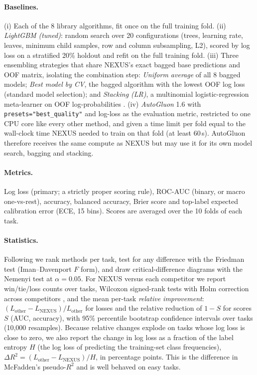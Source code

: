 \paragraph{Baselines.} (i) Each of the 8 library algorithms, fit once on the full
training fold. (ii) \emph{LightGBM (tuned)}: random search over 20
configurations (trees, learning rate, leaves, minimum child samples, row and
column subsampling, L2), scored by log loss on a stratified 20\% holdout and
refit on the full training fold. (iii) Three ensembling strategies that share
NEXUS's exact bagged base predictions and OOF matrix, isolating the combination
step: \emph{Uniform average} of all 8 bagged models; \emph{Best model by CV},
the bagged algorithm with the lowest OOF log loss (standard model selection);
and \emph{Stacking (LR)}, a multinomial logistic-regression meta-learner on
OOF log-probabilities \citep{wolpert1992stacked,breiman1996stacked}.
(iv) \emph{AutoGluon} 1.6 \citep{erickson2020autogluon} with
\texttt{presets="best\_quality"} and log-loss as the evaluation metric,
restricted to one CPU core like every other method, and given a time limit
per fold equal to the wall-clock time NEXUS needed to train on that fold (at
least 60\,s). AutoGluon therefore receives the same compute as NEXUS but may
use it for its own model search, bagging and stacking.

\paragraph{Metrics.} Log loss (primary; a strictly proper scoring rule),
ROC-AUC (binary, or macro one-vs-rest), accuracy, balanced accuracy, Brier score
and top-label expected calibration error (ECE, 15 bins). Scores are averaged over
the 10 folds of each task.

\paragraph{Statistics.} Following \citet{demsar2006statistical} we rank methods per
task, test for any difference with the Friedman test (Iman--Davenport $F$
form), and draw critical-difference diagrams with the Nemenyi test at
$\alpha{=}0.05$. For NEXUS versus each competitor we report win/tie/loss counts
over tasks, Wilcoxon signed-rank tests with Holm correction across competitors
\citep{garcia2008extension}, and the mean per-task \emph{relative improvement}:
$(L_\text{other}-L_\text{NEXUS})/L_\text{other}$ for losses and the relative
reduction of $1-S$ for scores $S$ (AUC, accuracy), with 95\% percentile bootstrap
confidence intervals over tasks (10{,}000 resamples). Because relative changes
explode on tasks whose log loss is close to zero, we also report the change in
log loss as a fraction of the label entropy $H$ (the log loss of predicting the
training-set class frequencies), $\Delta R^2 = (L_\text{other}-L_\text{NEXUS})/H$,
in percentage points. This is the difference in McFadden's pseudo-$R^2$ and is
well behaved on easy tasks.

